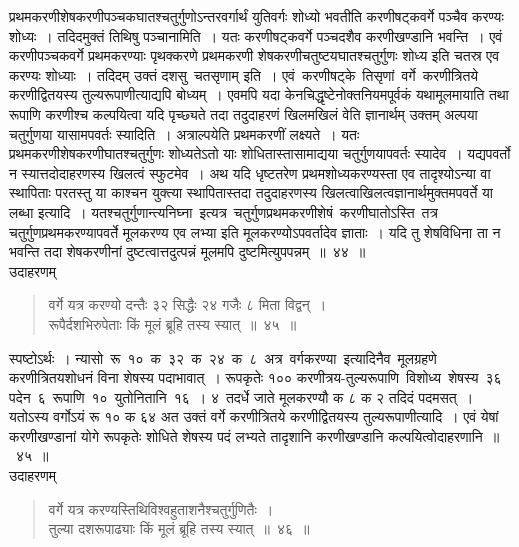 \documentclass[11pt, openany]{book}
\begin{document}
{{प्रथमकरणीशेषकरणीपञ्चकघातश्चतुर्गुणोऽन्तरवर्गार्थं युतिवर्गः शोध्यो
भवतीति करणीषट्कवर्गे पञ्चैव करण्यः शोध्यः~। तदिदमुक्तं तिथिषु पञ्चानामिति~। यतः करणीषट्कवर्गे पञ्चदशैव करणीखण्डानि भवन्ति~। एवं करणीपञ्चकवर्गे
प्रथमकरण्याः पृथक्करणे प्रथमकरणी शेषकरणीचतुष्टयघातश्चतुर्गुणः शोध्य इति
चतस्र एव करण्यः शोध्याः~। तदिदम् उक्तं दशसु \,चतसृणाम् इति~। एवं \,करणीषट्के \,तिसृणां \,वर्गे \,करणीत्रितये \,करणीद्वितयस्य तुल्यरूपाणीत्याद्यपि बोध्यम्~।
एवमपि यदा केनचिद्धृष्टेनोक्तनियमपूर्वकं यथामूलमायाति तथा रूपाणि करणीश्च
कल्पयित्वा यदि पृच्छ्यते तदा तदुदाहरणं खिलमखिलं वेति ज्ञानार्थम् उक्तम् अल्पया
चतुर्गुणया यासामपवर्तः स्यादिति~। अत्राल्पयेति प्रथमकरणीं लक्ष्यते~। यतः प्रथमकरणीशेषकरणीघातश्चतुर्गुणः शोध्यतेऽतो याः
शोधितास्तासामाद्यया चतुर्गुणयापवर्तः स्यादेव~। यद्यपवर्तो न
स्यात्तदोदाहरणस्य खिलत्वं स्फुटमेव~। अथ यदि धृष्टतरेण
प्रथमशोध्यकरण्यस्ता एव तादृश्योऽन्या वा स्थापिताः परतस्तु या काश्चन
युक्त्या स्थापितास्तदा तदुदाहरणस्य खिलत्वाखिलत्वज्ञानार्थमुक्तमपवर्ते या
लब्धा
\newpage
\noindent इत्यादि~। यतश्चतुर्गुणान्त्यनिघ्ना \,इत्यत्र \,चतुर्गुणप्रथमकरणीशेषं \,करणीघातोऽस्ति \,तत्र चतुर्गुणप्रथमकरण्यापवर्ते मूलकरण्य एव लभ्या इति
मूलकरण्योऽपवर्तादेव ज्ञाताः~। यदि तु शेषविधिना ता न भवन्ति तदा
शेषकरणीनां दुष्टत्वात्तदुत्पन्नं मूलमपि दुष्टमित्युपपन्नम्~॥~४४~॥\\

\vspace{-2mm}
{\bqt उदाहरणम्}
\begin{quote}
    \eg 
    वर्गे यत्र करण्यो दन्तैः ३२ सिद्धैः २४ गजैः ८ मिता विद्वन्~। \\
रूपैर्दशभिरुपेताः किं मूलं ब्रूहि तस्य स्यात्~॥~४५~॥
\end{quote}

स्पष्टोऽर्थः~। न्यासो \,रू \,१० \,क \,३२ \,क \,२४ \,क \,८ \,अत्र \,वर्गकरण्या \,इत्यादिनैव \,मूलग्रहणे करणीत्रितयशोधनं विना शेषस्य पदाभावात्~। रूपकृतेः १००
करणीत्रय-तुल्यरूपाणि \,विशोध्य \,शेषस्य \,३६ \,पदेन \,६ \,रूपाणि \,१० \,युतोनितानि \,१६~। ४ \,तदर्धे जाते मूलकरण्यौ क ८ क २ तदिदं पदमसत्~। यतोऽस्य वर्गोऽयं रू १० क ६४ अत उक्तं  वर्गे करणीत्रितये करणीद्वितयस्य तुल्यरूपाणीत्यादि~। एवं येषां
करणीखण्डानां योगे रूपकृतेः शोधिते शेषस्य पदं लभ्यते तादृशानि
करणीखण्डानि कल्पयित्वोदाहरणानि~॥~४५~॥\\

\vspace{-2mm}
{\bqt उदाहरणम्\textendash}

 \label{46}
\begin{quote}
    \eg 
    वर्गे यत्र करण्यस्तिथिविश्वहुताशनैश्चतुर्गुणितैः~। \\
तुल्या दशरूपाढ्याः किं मूलं ब्रूहि तस्य स्यात्~॥~४६~॥
\end{quote}

}}
\end{document}
